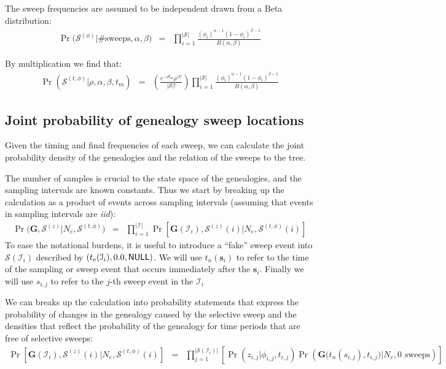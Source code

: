 \documentclass[letterpaper]{article}
\newcommand{\sweep}[1]{{\ensuremath{\mathbf{s}_{#1}}}}
\newcommand{\sweeptime}[1]{{\ensuremath{t_{#1}}}}
\newcommand{\sweepfreq}[1]{{\ensuremath{\phi_{#1}}}}
\newcommand{\sweeploc}[1]{{\ensuremath{z_{#1}}}}
\newcommand{\genealogy}{{\ensuremath{\mathbf{G}}}}
\newcommand{\popsize}{{\ensuremath{N_e}}}
\newcommand{\ratesweep}{{\ensuremath{\rho}}}
\newcommand{\sweepalpha}{{\ensuremath{\alpha}}}
\newcommand{\sweepbeta}{{\ensuremath{\beta}}}
\newcommand{\selectionmodel}{{\ensuremath{\ratesweep,\sweepalpha,\sweepbeta}}}
\newcommand{\interval}[1]{{\ensuremath{\mathcal{I}_{#1}}}}
\newcommand{\intervalEnd}[1]{{\ensuremath{t_e(\interval{#1})}}}
\newcommand{\entireSweepSet}{{\ensuremath{\mathcal{S}}}}
\newcommand{\sweepsetLocs}{{\ensuremath{\entireSweepSet^{(z)}}}}
\newcommand{\sweepsetTFs}{{\ensuremath{\entireSweepSet^{(t,\phi)}}}}
\newcommand{\sweepsetL}[1]{{\ensuremath{\sweepsetLocs({#1})}}}
\newcommand{\sweepsetTF}[1]{{\ensuremath{\sweepsetTFs({#1})}}}
\newcommand{\sweepset}[1]{{\ensuremath{\entireSweepSet({#1})}}}
\newcommand{\NULL}{{\ensuremath{\mbox{{\bf \sf NULL}}}}}
\newcommand{\timeNext}[1]{{\ensuremath{t_n(#1)}}}
\begin{document}
The sweep frequencies are assumed to be independent drawn from a Beta distribution:
\begin{eqnarray}
\Pr\Big(\entireSweepSet^{(\phi)} \Big| \mbox{\# sweeps}, \sweepalpha, \sweepbeta\Big) & = & \prod_{i = 1}^{|\entireSweepSet|} \frac{\left(\sweepfreq{i}\right)^{\sweepalpha-1}\left(1-\sweepfreq{i}\right)^{\sweepbeta-1}}{B(\sweepalpha, \sweepbeta)}
\end{eqnarray}

By multiplication we find that:
\begin{eqnarray}
\Pr(\sweepsetTFs |\selectionmodel, t_m) & = & \left(\frac{e^{-\ratesweep t_m}\ratesweep^{| \entireSweepSet |}}{| \entireSweepSet |!} \right) \prod_{i = 1}^{|\entireSweepSet|} \frac{\left(\sweepfreq{i}\right)^{\sweepalpha-1}\left(1-\sweepfreq{i}\right)^{\sweepbeta-1}}{B(\sweepalpha, \sweepbeta)}
\end{eqnarray}

\subsection{Joint probability of genealogy sweep locations}
Given the timing and final frequencies of each sweep, we can calculate the joint probability density of the genealogies and the relation of the sweeps to the tree.

The number of samples is crucial to the state space of the genealogies, and the sampling intervals are known constants.
Thus we start by breaking up the calculation as a product of events across sampling intervals (assuming that events in sampling intervals are {\em iid}):
\begin{eqnarray}
\Pr\Big(\genealogy, \sweepsetLocs \Big| \popsize, \sweepsetTFs \Big) & = & \prod_{i=1}^{|\interval{}|}\Pr\left[\genealogy(\interval{i}), \sweepsetL{i}  \Big|\popsize, \sweepsetTF{i}\right]
\end{eqnarray}
To ease the notational burdens, it is useful to introduce a ``fake'' sweep event into $\sweepset{\interval{i}}$ described by $(\intervalEnd{i}, 0.0, \NULL)$.  
We will use $\timeNext{\sweep{i}}$ to refer to the time of the sampling or sweep event that occurs immediately after the $\sweep{i}$.
Finally we will use $s_{i,j}$ to refer to the $j$-th sweep event in the $\interval{i}$

We can breaks up the calculation into probability statements that express the probability of changes in the genealogy caused by the selective sweep and the densities that reflect the probability of the genealogy for time periods that are free of selective sweeps:
\begin{eqnarray*}
\Pr\left[\genealogy(\interval{i}), \sweepsetL{i}  \Big|\popsize, \sweepsetTF{i}\right] & = & \prod_{j = 1}^{|\sweepset{\interval{i}}|}\left[\Pr\left(\sweeploc{i,j}|\sweepfreq{i,j},\sweeptime{i,j}\right)\Pr\left(\genealogy\Big(\timeNext{s_{i,j}},\sweeptime{i,j}\Big) \Big|\popsize, \mbox{0 sweeps}\right)\right]
\end{eqnarray*}
\end{document}
